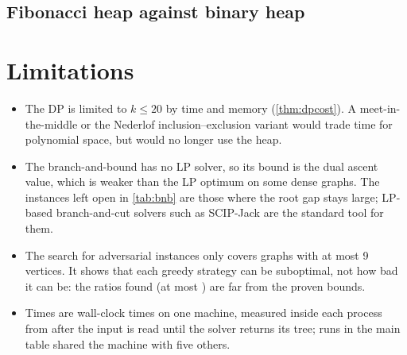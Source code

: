 

\subsection{Fibonacci heap against binary heap}\label{sec:ablation}



\section{Limitations}\label{sec:limits}
\begin{itemize}
\item The DP is limited to \(k\le20\) by time and memory (\cref{thm:dpcost}). A meet-in-the-middle or the Nederlof
inclusion--exclusion variant would trade time for polynomial space, but would no longer use the heap.
\item The branch-and-bound has no LP solver, so its bound is the dual ascent value, which is weaker than the LP optimum on some dense
graphs. The instances left open in \cref{tab:bnb} are those where the root gap stays large; LP-based branch-and-cut solvers such as
SCIP-Jack are the standard tool for them.
\item The search for adversarial instances only covers graphs with at most 9 vertices. It shows that each greedy strategy can be
suboptimal, not how bad it can be: the ratios found (at most ) are far from the proven bounds.
\item Times are wall-clock times on one machine, measured inside each process from after the input is read until the solver returns its tree;
runs in the main table shared the machine with five others.
\end{itemize}
